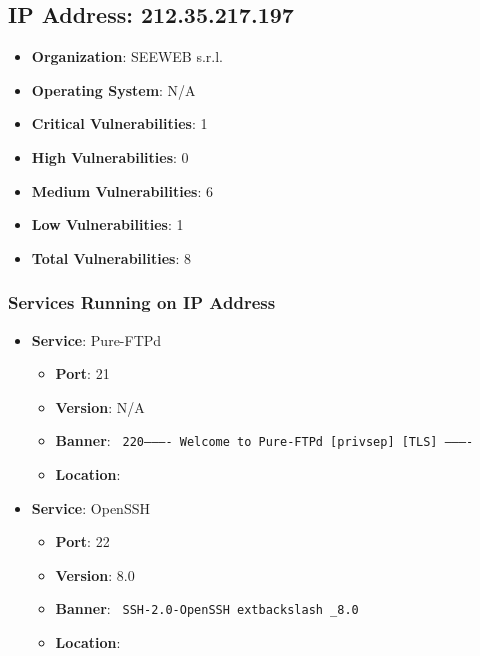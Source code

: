 \documentclass{article}
\begin{document}
\clearpage



\subsection*{IP Address: 212.35.217.197}

\begin{itemize}
    \item \textbf{Organization}: SEEWEB s.r.l.
    \item \textbf{Operating System}:  N/A 
    \item \textbf{Critical Vulnerabilities}: 1
    \item \textbf{High Vulnerabilities}: 0
    \item \textbf{Medium Vulnerabilities}: 6
    \item \textbf{Low Vulnerabilities}: 1
    \item \textbf{Total Vulnerabilities}: 8
\end{itemize}

\subsubsection*{Services Running on IP Address}

\begin{itemize}
    
        \item \textbf{Service}: Pure-FTPd
        \begin{itemize}
            \item \textbf{Port}: 21
            \item \textbf{Version}:  N/A 
            \item \textbf{Banner}: \texttt{ 220---------- Welcome to Pure-FTPd [privsep] [TLS] ---------- }
            \item \textbf{Location}: \href{  }{  }
        \end{itemize}
    
        \item \textbf{Service}: OpenSSH
        \begin{itemize}
            \item \textbf{Port}: 22
            \item \textbf{Version}:  8.0 
            \item \textbf{Banner}: \texttt{ SSH-2.0-OpenSSH	extbackslash _8.0 }
            \item \textbf{Location}: \href{  }{  }
        \end{itemize}
    
\end{itemize}
\end{document}
